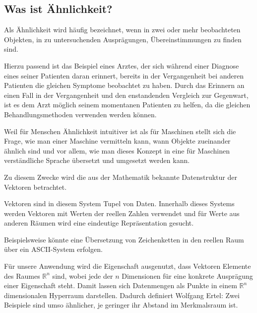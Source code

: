 \documentclass[fontsize=11pt]{scrartcl}
\begin{document}
            \subsection{Was ist Ähnlichkeit?}
                Als Ähnlichkeit wird häufig bezeichnet, wenn in zwei oder mehr beobachteten Objekten, in zu untersuchenden Ausprägungen, Übereinstimmungen zu finden sind.\par
                Hierzu passend ist das Beispiel eines Arztes, der sich während einer Diagnose eines seiner Patienten daran erinnert, bereits in der Vergangenheit bei anderen Patienten die gleichen Symptome beobachtet zu haben.\cite{ertel2016} Durch das Erinnern an einen Fall in der Vergangenheit und den enstandenden Vergleich zur Gegenwart, ist es dem Arzt möglich seinem momentanen Patienten zu helfen, da die gleichen Behandlungsmethoden verwenden werden können.\par
                Weil für Menschen Ähnlichkeit intuitiver ist als für Maschinen stellt sich die Frage, wie man einer Maschine vermitteln kann, wann Objekte zueinander ähnlich sind und vor allem, wie man dieses Konzept in eine für Maschinen verständliche Sprache übersetzt und umgesetzt werden kann.\par
                Zu diesem Zwecke wird die aus der Mathematik bekannte Datenstruktur der Vektoren betrachtet.

                Vektoren sind in diesem System Tupel von Daten. Innerhalb dieses Systems werden Vektoren mit Werten der reellen Zahlen verwendet und für Werte aus anderen Räumen wird eine eindeutige Repräsentation gesucht.\par Beispielsweise könnte eine Übersetzung von Zeichenketten in den reellen Raum über ein ASCII-System erfolgen.\par 
                Für unsere Anwendung wird die Eigenschaft ausgenutzt, dass Vektoren Elemente des Raumes $\mathbb{R}^n$ sind, wobei jede der $n$ Dimensionen für eine konkrete Ausprägung einer Eigenschaft steht. Damit lassen sich Datenmengen als Punkte in einem $\mathbb{R}^n$ dimensionalen Hyperraum darstellen. Dadurch definiert Wolfgang Ertel: \glqq Zwei Beispiele sind umso ähnlicher, je geringer ihr Abstand im Merkmalsraum ist.\grqq \cite[S. 207]{ertel2016} %
\end{document}
